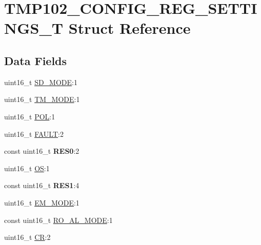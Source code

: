 \hypertarget{structTMP102__CONFIG__REG__SETTINGS__T}{}\section{T\+M\+P102\+\_\+\+C\+O\+N\+F\+I\+G\+\_\+\+R\+E\+G\+\_\+\+S\+E\+T\+T\+I\+N\+G\+S\+\_\+T Struct Reference}
\label{structTMP102__CONFIG__REG__SETTINGS__T}
\subsection*{Data Fields}
\begin{DoxyCompactItemize}
\item 
uint16\+\_\+t \hyperlink{structTMP102__CONFIG__REG__SETTINGS__T_a81f77be9673afe30da33edb8e6e62b55}{S\+D\+\_\+\+M\+O\+DE}\+:1
\item 
uint16\+\_\+t \hyperlink{structTMP102__CONFIG__REG__SETTINGS__T_a635d77b82a949a2299e1981d7ace305d}{T\+M\+\_\+\+M\+O\+DE}\+:1
\item 
uint16\+\_\+t \hyperlink{structTMP102__CONFIG__REG__SETTINGS__T_a2225a8d1e41436fe30577b474c99c737}{P\+OL}\+:1
\item 
uint16\+\_\+t \hyperlink{structTMP102__CONFIG__REG__SETTINGS__T_a6c73d5cc6105f5afd1dbb33454705ec3}{F\+A\+U\+LT}\+:2
\item 
const uint16\+\_\+t {\bfseries R\+E\+S0}\+:2\hypertarget{structTMP102__CONFIG__REG__SETTINGS__T_ae0c076ab9ff772db54bd811ecf1cef71}{}\label{structTMP102__CONFIG__REG__SETTINGS__T_ae0c076ab9ff772db54bd811ecf1cef71}

\item 
uint16\+\_\+t \hyperlink{structTMP102__CONFIG__REG__SETTINGS__T_a09870f580e0e800f3eb23f640f07a3c3}{OS}\+:1
\item 
const uint16\+\_\+t {\bfseries R\+E\+S1}\+:4\hypertarget{structTMP102__CONFIG__REG__SETTINGS__T_a62bc2c4b934d561e2f32949c61f6b016}{}\label{structTMP102__CONFIG__REG__SETTINGS__T_a62bc2c4b934d561e2f32949c61f6b016}

\item 
uint16\+\_\+t \hyperlink{structTMP102__CONFIG__REG__SETTINGS__T_a9837531af532e0c8a1fdd39095c250fb}{E\+M\+\_\+\+M\+O\+DE}\+:1
\item 
const uint16\+\_\+t \hyperlink{structTMP102__CONFIG__REG__SETTINGS__T_a7bd3f8bf4d72156773a9cb9abde52596}{R\+O\+\_\+\+A\+L\+\_\+\+M\+O\+DE}\+:1
\item 
uint16\+\_\+t \hyperlink{structTMP102__CONFIG__REG__SETTINGS__T_aa0d2ccdd3d62d5f817bd34be36ddb2b1}{CR}\+:2
\end{DoxyCompactItemize}


